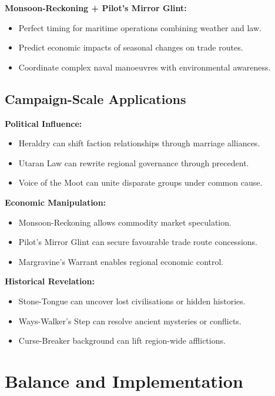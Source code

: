 \textbf{Monsoon-Reckoning + Pilot's Mirror Glint:}
\begin{itemize}
    \item Perfect timing for maritime operations combining weather and law.
    \item Predict economic impacts of seasonal changes on trade routes.
    \item Coordinate complex naval manoeuvres with environmental awareness.
\end{itemize}

\subsection{Campaign-Scale Applications}\label{subsec:campaign_scale}

\textbf{Political Influence:}
\begin{itemize}
    \item Heraldry can shift faction relationships through marriage alliances.
    \item Utaran Law can rewrite regional governance through precedent.
    \item Voice of the Moot can unite disparate groups under common cause.
\end{itemize}

\textbf{Economic Manipulation:}
\begin{itemize}
    \item Monsoon-Reckoning allows commodity market speculation.
    \item Pilot's Mirror Glint can secure favourable trade route concessions.
    \item Margravine's Warrant enables regional economic control.
\end{itemize}

\textbf{Historical Revelation:}
\begin{itemize}
    \item Stone-Tongue can uncover lost civilisations or hidden histories.
    \item Ways-Walker's Step can resolve ancient mysteries or conflicts.
    \item Curse-Breaker background can lift region-wide afflictions.
\end{itemize}

\section{Balance and Implementation}\label{sec:balance_implementation}

